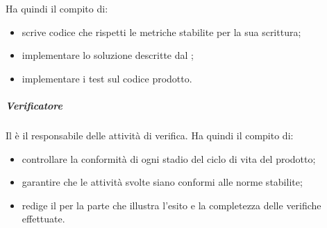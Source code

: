 				Ha quindi il compito di:
					\begin{itemize}
						\item scrive codice che rispetti le metriche stabilite per la sua scrittura;
						\item implementare lo soluzione descritte dal \roleDesigner;
						\item implementare i test sul codice prodotto.
					\end{itemize}
				\subparagraph{Verificatore}
				Il \roleVerifier{} è il responsabile delle attività di verifica. \newline
				Ha quindi il compito di:
					\begin{itemize}
						\item controllare la conformità di ogni stadio del ciclo di vita del prodotto;
						\item garantire che le attività svolte siano conformi alle norme stabilite;
						\item redige il \docNameVersionPdQ{} per la parte che illustra l'esito e la completezza delle verifiche effettuate.
					\end{itemize}

